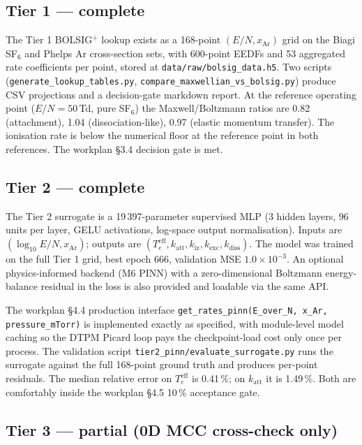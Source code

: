 \documentclass[11pt,a4paper]{article}
\newcommand{\sfsix}{SF$_6$}
\begin{document}
\subsection*{Tier 1 --- complete}

The Tier 1 BOLSIG$^+$ lookup exists as a 168-point
$(E/N, x_{\mathrm{Ar}})$ grid on the Biagi \sfsix{} and Phelps Ar
cross-section sets, with 600-point EEDFs and 53 aggregated rate
coefficients per point, stored at
\texttt{data/raw/bolsig\_data.h5}. Two scripts
(\texttt{generate\_lookup\_tables.py},
\texttt{compare\_maxwellian\_vs\_bolsig.py}) produce CSV projections
and a decision-gate markdown report. At the reference operating
point ($E/N = 50$\,Td, pure \sfsix{}) the Maxwell/Boltzmann ratios
are 0.82 (attachment), 1.04 (dissociation-like), 0.97 (elastic
momentum transfer). The ionisation rate is below the numerical
floor at the reference point in both references. The workplan §3.4
decision gate is met.

\subsection*{Tier 2 --- complete}

The Tier 2 surrogate is a 19\,397-parameter supervised MLP (3 hidden
layers, 96 units per layer, GELU activations, log-space output
normalisation). Inputs are $(\log_{10} E/N, x_{\mathrm{Ar}})$;
outputs are $(T_e^{\mathrm{eff}}, k_{\mathrm{att}},
k_{\mathrm{iz}}, k_{\mathrm{exc}}, k_{\mathrm{diss}})$. The model
was trained on the full Tier 1 grid, best epoch 666, validation MSE
$1.0\times 10^{-3}$. An optional physics-informed backend (M6 PINN)
with a zero-dimensional Boltzmann energy-balance residual in the
loss is also provided and loadable via the same API.

The workplan §4.4 production interface
\texttt{get\_rates\_pinn(E\_over\_N, x\_Ar, pressure\_mTorr)} is
implemented exactly as specified, with module-level model caching so
the DTPM Picard loop pays the checkpoint-load cost only once per
process. The validation script
\texttt{tier2\_pinn/evaluate\_surrogate.py} runs the surrogate
against the full 168-point ground truth and produces per-point
residuals. The median relative error on $T_e^{\mathrm{eff}}$ is
0.41\,\%; on $k_{\mathrm{att}}$ it is 1.49\,\%. Both are comfortably
inside the workplan §4.5 10\,\% acceptance gate.

\subsection*{Tier 3 --- partial (0D MCC cross-check only)}
\end{document}
